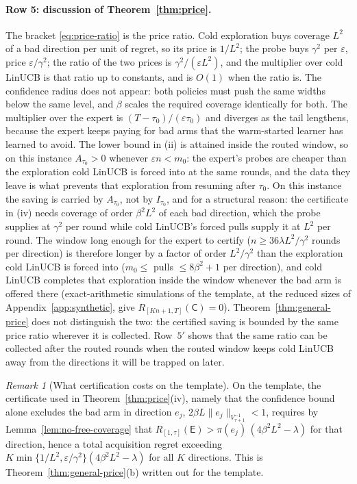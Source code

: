 \documentclass{article}
\theoremstyle{definition}
\theoremstyle{remark}
\newtheorem{remark}{Remark}
\newcommand{\eps}{\varepsilon}
\theoremstyle{remark}
\newcommand{\Cold}{\mathsf{C}}
\newcommand{\Exp}{\mathsf{E}}
\begin{document}
\paragraph{Row 5: discussion of Theorem~\ref{thm:price}.}
The bracket \eqref{eq:price-ratio} is the price ratio. Cold exploration buys
coverage $L^2$ of a bad direction per unit of regret, so its price is $1/L^2$;
the probe buys $\gamma^2$ per $\eps$, price $\eps/\gamma^2$; the ratio of the two prices
is $\gamma^2/(\eps L^2)$, and the multiplier over cold LinUCB is that ratio up to
constants, and is $O(1)$ when the ratio is. The confidence radius does not
appear: both policies must push the same widths below the same level, and
$\beta$ scales the required coverage identically for both. The multiplier
over the expert is $(T-\tau_0)/(\eps\tau_0)$ and diverges as the tail
lengthens, because the expert keeps paying for bad arms that the warm-started
learner has learned to avoid. The lower bound in (ii) is attained inside the
routed window, so on this instance $A_{\tau_0}>0$ whenever $\eps n<m_0$: the
expert's probes are cheaper than the exploration cold LinUCB is forced into
at the same rounds, and the data they leave is what prevents that exploration
from resuming after $\tau_0$. On this instance the saving is carried by
$A_{\tau_0}$, not by $I_{\tau_0}$, and for a structural reason: the
certificate in (iv) needs coverage of order $\beta^2L^2$ of each bad
direction, which the probe supplies at $\gamma^2$ per round while cold LinUCB's
forced pulls supply it at $L^2$ per round. The window long enough for the
expert to certify ($n\ge36\lambda L^2/\gamma^2$ rounds per direction) is therefore
longer by a factor of order $L^2/\gamma^2$ than the exploration cold LinUCB is
forced into ($m_0\le$ pulls $\le 8\beta^2+1$ per direction), and cold LinUCB
completes that exploration inside the window whenever the bad arm is offered
there (exact-arithmetic simulations of the template, at the reduced sizes of
Appendix~\ref{app:synthetic}, give $R_{[Kn+1,T]}(\Cold)=0$). Theorem~\ref{thm:general-price}
does not distinguish the two: the certified saving is bounded by the
same price ratio wherever it is collected. Row~$5'$ shows that the same ratio
can be collected after the routed rounds when the routed window keeps cold
LinUCB away from the directions it will be trapped on later.

\begin{remark}[What certification costs on the template]
On the template, the certificate used in Theorem~\ref{thm:price}(iv), namely
that the confidence bound alone excludes the bad arm in direction $e_j$,
$2\beta L\|e_j\|_{V_{\tau+1}^{-1}}<1$, requires by
Lemma~\ref{lem:no-free-coverage} that
$R_{[1,\tau]}(\Exp)>\pi(e_j)\,(4\beta^2L^2-\lambda)$ for that direction, hence
a total acquisition regret exceeding
$K\min\{1/L^2,\eps/\gamma^2\}(4\beta^2L^2-\lambda)$ for all $K$ directions. This is
Theorem~\ref{thm:general-price}(b) written out for the template.
\end{remark}
\end{document}
